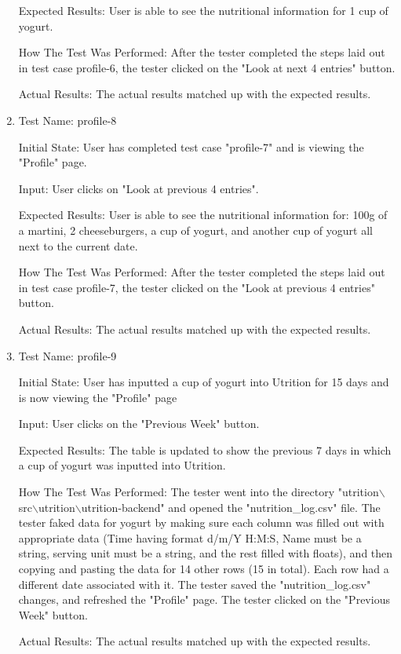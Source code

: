 \documentclass[12pt, titlepage]{article}
\begin{document}
\begin{enumerate}
		Expected Results: User is able to see the nutritional information for 1 cup of yogurt.
		
		How The Test Was Performed: After the tester completed the steps laid out in test case profile-6, the tester clicked on the "Look at next 4 entries" button.
		
		Actual Results: The actual results matched up with the expected results.
		
		\item{Test Name: profile-8}
		
		Initial State: User has completed test case "profile-7" and is viewing the "Profile" page.
		
		Input: User clicks on "Look at previous 4 entries".
		
		Expected Results: User is able to see the nutritional information for: 100g of a martini, 2 cheeseburgers, a cup of yogurt, and another cup of yogurt all next to the current date.
		
		How The Test Was Performed: After the tester completed the steps laid out in test case profile-7, the tester clicked on the "Look at previous 4 entries" button.
		
		Actual Results: The actual results matched up with the expected results.
		
		\item{Test Name: profile-9}
		
		Initial State: User has inputted a cup of yogurt into Utrition for 15 days and is now viewing the "Profile" page
		
		Input: User clicks on the "Previous Week" button.
		
		Expected Results: The table is updated to show the previous 7 days in which a cup of yogurt was inputted into Utrition. 
		
		How The Test Was Performed: The tester went into the directory "utrition$\backslash$src$\backslash$utrition$\backslash$utrition-backend" and opened the "nutrition\_log.csv" file. The tester faked data for yogurt by making sure each column was filled out with appropriate data (Time having format d/m/Y H:M:S, Name must be a string, serving unit must be a string, and the rest filled with floats), and then copying and pasting the data for 14 other rows (15 in total). Each row had a different date associated with it. The tester saved the "nutrition\_log.csv" changes, and refreshed the "Profile" page. The tester clicked on the "Previous Week" button.
		
		Actual Results: The actual results matched up with the expected results.
		

\end{enumerate}
\end{document}
